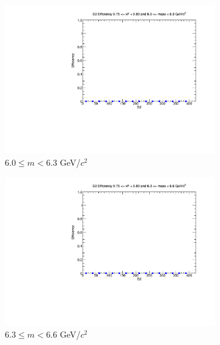 \documentclass[11pt]{article}
\begin{document}
\begin{figure}[p]
\begin{subfigure}[b]{0.32\textwidth}
        \includegraphics[width=\textwidth]{./kTrackerEfficiencyPlots/D2_Efficiency_xF15_mass6.pdf}
        \caption{$6.0 \leq m < 6.3$ GeV/$c^2$}
    \end{subfigure}\hfill
    \begin{subfigure}[b]{0.32\textwidth}
        \centering
        \includegraphics[width=\textwidth]{./kTrackerEfficiencyPlots/D2_Efficiency_xF15_mass7.pdf}
        \caption{$6.3 \leq m < 6.6$ GeV/$c^2$}
    \end{subfigure}\hfill
    \begin{subfigure}[b]{0.32\textwidth}
        \centering

\end{subfigure}
\end{figure}
\end{document}
